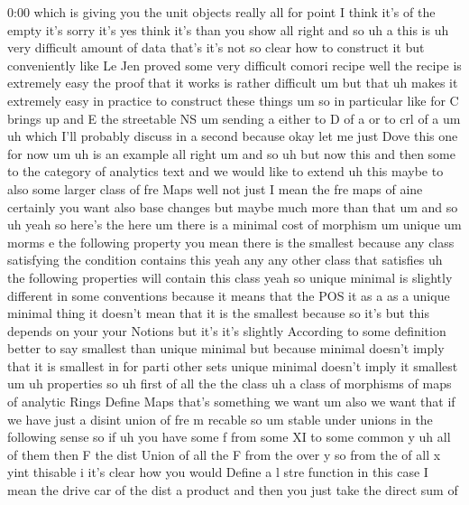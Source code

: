 \begin{unfinished}{0:00}
which  is  giving  you  the  unit  objects
really
all  for
point  I  think  it's  of  the  empty  it's
sorry  it's  yes  think  it's  than  you
show
all  right  and  so  uh  a  this  is
uh  very  difficult  amount  of  data  that's
it's  not  so  clear  how  to  construct  it
but  conveniently  like  Le  Jen  proved  some
very  difficult  comori  recipe  well  the
recipe  is  extremely  easy  the  proof  that
it  works  is  rather  difficult  um  but  that
uh  makes  it  extremely  easy  in  practice
to  construct  these  things  um  so  in
particular  like
for
C  brings  up  and  E  the  streetable
NS  um  sending  a  either  to  D  of  a  or  to
crl  of
a
um  uh  which  I'll  probably  discuss  in  a
second  because  okay  let  me  just  Dove
this  one  for  now  um  uh  is  an
example
all  right
um  and
so  uh  but  now  this  and  then  some  to  the
category  of  analytics
text  and  we  would  like  to  extend  uh  this
maybe  to  also  some  larger  class  of  fre
Maps  well  not  just  I  mean  the  fre  maps
of  aine  certainly  you  want  also  base
changes  but  maybe  much  more  than  that  um
and
so  uh  yeah  so  here's  the
here  um
there  is  a  minimal  cost  of
morphism  um
unique  um  morms
e
the  following
property  you  mean  there  is  the
smallest  because  any  class  satisfying
the  condition  contains  this  yeah  any  any
other  class  that  satisfies  uh  the
following  properties  will  contain  this
class  yeah  so  unique  minimal  is  slightly
different  in  some  conventions  because  it
means  that  the  POS  it  as  a  as  a  unique
minimal  thing  it  doesn't  mean  that  it  is
the  smallest  because  so  it's  but  this
depends  on  your  your  Notions  but  it's
it's
slightly  According  to  some  definition
better  to  say  smallest  than  unique
minimal  but  because  minimal  doesn't
imply  that  it  is  smallest  in  for  parti
other  sets  unique  minimal  doesn't  imply
it
smallest
um  uh  properties  so
uh  first  of  all  the  the
class  uh  a  class  of  morphisms  of  maps  of
analytic  Rings  Define  Maps  that's
something  we  want
um  also  we  want  that  if  we  have  just  a
disint  union  of  fre  m  recable  so
um  stable  under  unions  in  the  following
sense  so  if  uh  you  have  some
f  from  some  XI  to  some  common  y
uh  all  of
them  then  F  the  dist  Union  of  all  the  F
from  the
over  y  so  from  the  of  all  x
yint
thisable  i  it's  clear  how  you  would
Define  a  l  stre  function  in  this  case  I
mean  the  drive  car  of  the  dist  a  product
and  then  you  just  take  the  direct  sum  of

\end{unfinished}
